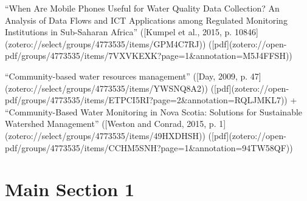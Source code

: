 “When Are Mobile Phones Useful for Water Quality Data Collection? An Analysis of Data Flows and ICT Applications among Regulated Monitoring Institutions in Sub-Saharan Africa” ([Kumpel et al., 2015, p. 10846](zotero://select/groups/4773535/items/GPM4C7RJ)) ([pdf](zotero://open-pdf/groups/4773535/items/7VXVKEXK?page=1&annotation=M5J4FFSH))


“Community-based water resources management” ([Day, 2009, p. 47](zotero://select/groups/4773535/items/YWSNQ8A2)) ([pdf](zotero://open-pdf/groups/4773535/items/ETPCI5RI?page=2&annotation=RQLJMKL7))
+
“Community-Based Water Monitoring in Nova Scotia: Solutions for Sustainable Watershed Management” ([Weston and Conrad, 2015, p. 1](zotero://select/groups/4773535/items/49HXDHSH)) ([pdf](zotero://open-pdf/groups/4773535/items/CCHM5SNH?page=1&annotation=94TW58QF))



\section{Main Section 1}